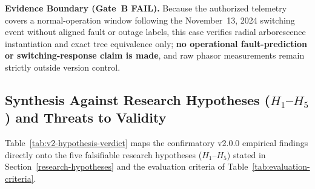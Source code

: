 \textbf{Evidence Boundary (Gate~B FAIL).} Because the authorized
telemetry covers a normal-operation window following the November~13,
2024 switching event without aligned fault or outage labels, this case
verifies radial arborescence instantiation and exact tree equivalence
only; \textbf{no operational fault-prediction or switching-response
claim is made}, and raw phasor measurements remain strictly outside
version control.

\subsection{Synthesis Against Research Hypotheses (\texorpdfstring{$H_1$--$H_5$}{H1--H5}) and Threats to Validity}
\label{sec:v2-synthesis-threats}

Table~\ref{tab:v2-hypothesis-verdict} maps the confirmatory v2.0.0
empirical findings directly onto the five falsifiable research
hypotheses ($H_1$--$H_5$) stated in Section~\ref{research-hypotheses}
and the evaluation criteria of Table~\ref{tab:evaluation-criteria}.

